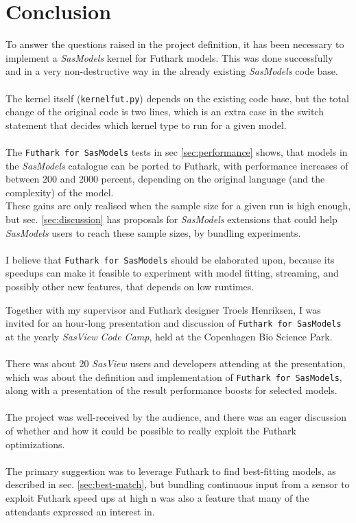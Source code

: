 \documentclass[11pt]{article}
\newcommand{\sasmodels}{\textit{SasModels}}
\newcommand{\sasview}{\textit{SasView}}
\newcommand{\futhark}{\texttt{Futhark for SasModels}}
\begin{document}
\section{Conclusion}
To answer the questions raised in the project definition, it has been 
necessary to implement a \sasmodels{} kernel for Futhark models. This was done
successfully and in a very non-destructive way in the already existing
\sasmodels{} code base.
\\\\
The kernel itself (\texttt{kernelfut.py}) depends on the existing code base, but
the total change of the original code is two lines, which is an extra case in the
switch statement that decides which kernel type to run for a given model.
\\\\
The \futhark{} tests in sec \ref{sec:performance} shows, that models
in the \sasmodels{} catalogue can be ported to Futhark, with performance
increases of between 200 and 2000 percent, depending on the original language
(and the complexity) of the model.
\\
These gains are only realised when the sample size for a given run is high
enough, but sec. \ref{sec:discussion} has proposals for \sasmodels{} extensions
that could help \sasmodels{} users to reach these sample sizes, by bundling
experiments.
\\\\
I believe that \futhark{} should be elaborated upon, because its speedups can
make it feasible to experiment with model fitting, streaming, and possibly other
new features, that depends on low runtimes.
\begin{mdframed}[
  frametitle={Presentation at \sasview{} Code Camp},
  nobreak=true
  ]
Together with my supervisor and Futhark designer Troels Henriksen,
I was invited for an hour-long presentation and discussion of \futhark{} at the
yearly \textit{SasView Code Camp}, held at the Copenhagen Bio Science Park.\\\\
There was about 20 \sasview{} users and developers attending at the presentation,
which was about the definition and implementation of \futhark{}, along with
a presentation of the result performance boosts for selected models.\\\\
The project was well-received by the audience, and there was an eager discussion
of whether and how it could be possible to really exploit the Futhark
optimizations.\\\\
The primary suggestion was to leverage Futhark to find best-fitting models,
as described in sec. \ref{sec:best-match}, but bundling continuous input from
a sensor to exploit Futhark speed ups at high n was also a feature that many
of the attendants expressed an interest in.
\end{mdframed}
\end{document}
